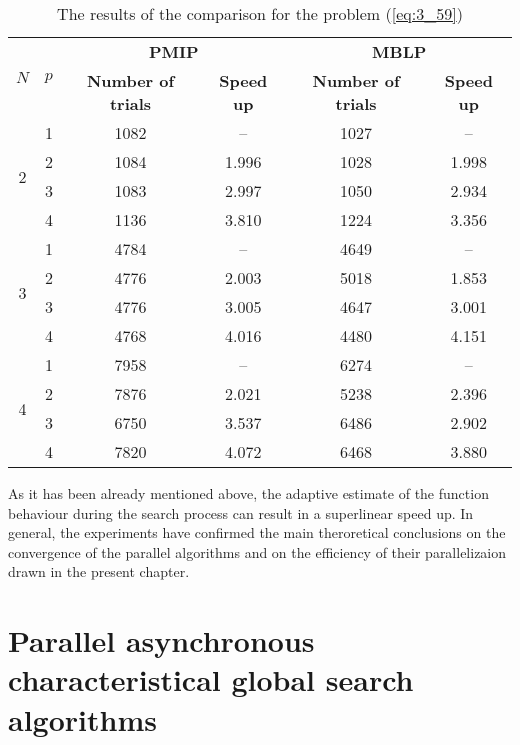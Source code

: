 	\begin{table}[ht]
		\centering
		\caption{The results of the comparison for the problem  (\ref{eq:3_59})}
		\label{tab:3_3}
		{\setlength{\extrarowheight}{1.5pt}
		\begin{tabular}
			{|c|c|c|c|c|c|}
			\hline
			\multirow{2}{*}{\textbf{$N$}} 
			& \multirow{2}{*}{\textbf{$p$}} 
			& \multicolumn{2}{|c|}{\textbf{PMIP}} 
			& \multicolumn{2}{|c|}{\textbf{MBLP}} \\
			\cline{3-6}
			&  & \textbf{Number of trials} & \textbf{Speed up} 
			& \textbf{Number of trials} & \textbf{Speed up} \\ 
			\hline
			\multirow{4}{*}{2}
			& 1 & 1082 & --    & 1027 & --    \\ \cline{3-6}
			& 2 & 1084 & 1.996 & 1028 & 1.998 \\ \cline{3-6}
			& 3 & 1083 & 2.997 & 1050 & 2.934 \\ \cline{3-6}
			& 4 & 1136 & 3.810 & 1224 & 3.356 \\ \hline
			\multirow{4}{*}{3}
			& 1 & 4784 & --    & 4649 & --    \\ \cline{3-6}
			& 2 & 4776 & 2.003 & 5018 & 1.853 \\ \cline{3-6}
			& 3 & 4776 & 3.005 & 4647 & 3.001 \\ \cline{3-6}
			& 4 & 4768 & 4.016 & 4480 & 4.151 \\ \hline
			\multirow{4}{*}{4}
			& 1 & 7958 & --    & 6274 & --    \\ \cline{3-6}
			& 2 & 7876 & 2.021 & 5238 & 2.396 \\ \cline{3-6}
			& 3 & 6750 & 3.537 & 6486 & 2.902 \\ \cline{3-6}
			& 4 & 7820 & 4.072 & 6468 & 3.880 \\ \hline
		\end{tabular}
	}
	\end{table}


	As it has been already mentioned above, the adaptive estimate of the function behaviour during the search process can result in a superlinear speed up. In general, the experiments have confirmed the main theroretical conclusions on the convergence of the parallel algorithms and on the efficiency of their parallelizaion drawn in the present chapter.
	
	\section{Parallel asynchronous characteristical global search algorithms}
	
